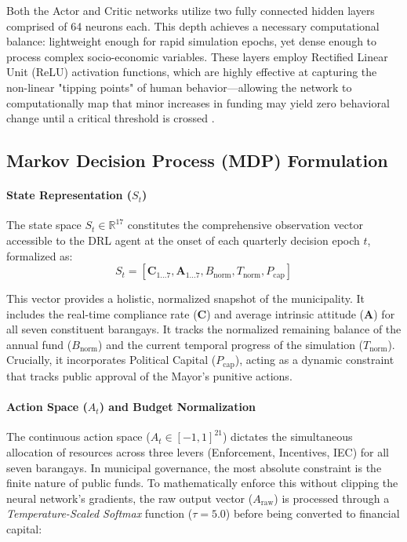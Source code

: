 Both the Actor and Critic networks utilize two fully connected hidden layers comprised of 64 neurons each. This depth achieves a necessary computational balance: lightweight enough for rapid simulation epochs, yet dense enough to process complex socio-economic variables. These layers employ Rectified Linear Unit (ReLU) activation functions, which are highly effective at capturing the non-linear "tipping points" of human behavior—allowing the network to computationally map that minor increases in funding may yield zero behavioral change until a critical threshold is crossed \citep{Centola2018}.

\subsection{Markov Decision Process (MDP) Formulation}

\paragraph{State Representation ($S_t$)}
The state space $S_t \in \mathbb{R}^{17}$ constitutes the comprehensive observation vector accessible to the DRL agent at the onset of each quarterly decision epoch $t$, formalized as:
\begin{equation}
    S_t = [\mathbf{C}_{1...7}, \mathbf{A}_{1...7}, B_{\mathrm{norm}}, T_{\mathrm{norm}}, P_{\mathrm{cap}}]
    \label{eq:state_vector}
\end{equation}

\noindent This vector provides a holistic, normalized snapshot of the municipality. It includes the real-time compliance rate ($\mathbf{C}$) and average intrinsic attitude ($\mathbf{A}$) for all seven constituent barangays. It tracks the normalized remaining balance of the annual fund ($B_{\mathrm{norm}}$) and the current temporal progress of the simulation ($T_{\mathrm{norm}}$). Crucially, it incorporates Political Capital ($P_{\mathrm{cap}}$), acting as a dynamic constraint that tracks public approval of the Mayor's punitive actions.

\paragraph{Action Space ($A_t$) and Budget Normalization}
The continuous action space ($A_t \in [-1, 1]^{21}$) dictates the simultaneous allocation of resources across three levers (Enforcement, Incentives, IEC) for all seven barangays. In municipal governance, the most absolute constraint is the finite nature of public funds. To mathematically enforce this without clipping the neural network's gradients, the raw output vector ($A_{\mathrm{raw}}$) is processed through a \textit{Temperature-Scaled Softmax} function ($\tau = 5.0$) before being converted to financial capital:

